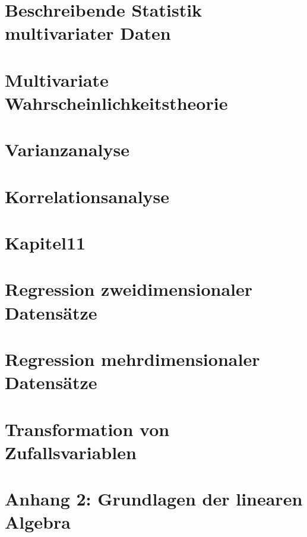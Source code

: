 \clearpage

\section{Beschreibende Statistik multivariater Daten}\label{seven}


\clearpage

\section{Multivariate Wahrscheinlichkeitstheorie}\label{eight}


\clearpage

\section{Varianzanalyse}\label{nine}


\clearpage

\section{Korrelationsanalyse}\label{ten}


\clearpage

\section{Kapitel11}\label{eleven}

\clearpage

\section{Regression zweidimensionaler Datensätze}\label{twelve}


\clearpage

\section{Regression mehrdimensionaler Datensätze}\label{thirteen}


\clearpage

\section{Transformation von Zufallsvariablen}\label{fourteen}

\clearpage

\section{Anhang 2: Grundlagen der linearen Algebra}\label{fifteen}




